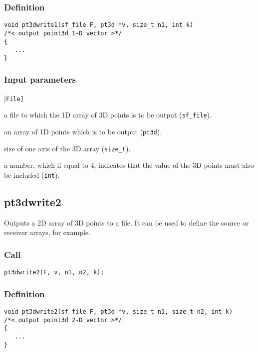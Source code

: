 \subsubsection*{Definition}
\begin{verbatim}
void pt3dwrite1(sf_file F, pt3d *v, size_t n1, int k)
/*< output point3d 1-D vector >*/
{
   ...
}
\end{verbatim}

\subsubsection*{Input parameters}
\begin{desclist}{\tt }{\quad}[\tt File]
   \setlength\itemsep{0pt}
   \item[File] a file to which the 1D array of 3D points is to be output (\texttt{sf\_file}). 
   \item[v]    an array of 1D points which is to be output (\texttt{pt3d}). 
   \item[n1]   size of one axis of the 3D array (\texttt{size\_t}). 
   \item[k]    a number, which if equal to 4, indicates that the value of the 3D points must also be included (\texttt{int}).     
\end{desclist}




\subsection{{pt3dwrite2}}
Outputs a 2D array of 3D points to a file. It can be used to define the source or receiver arrays, for example.

\subsubsection*{Call}
\begin{verbatim}pt3dwrite2(F, v, n1, n2, k);\end{verbatim}

\subsubsection*{Definition}
\begin{verbatim}
void pt3dwrite2(sf_file F, pt3d *v, size_t n1, size_t n2, int k)
/*< output point3d 2-D vector >*/
{
   ... 
}
\end{verbatim}

